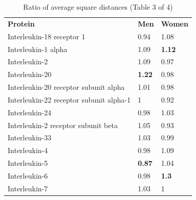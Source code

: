 \begin{table}[ht]
\caption{Ratio of average square distances (Table 3 of 4)}
\centering
\renewcommand{\arraystretch}{1.2}
\begin{tabular}{lll}
\rowcolor[HTML]{FFFFC7} 
\textbf{Protein}                        & \textbf{Men}                         & \textbf{Women}                       \\
Interleukin-18 receptor 1               & {\color[HTML]{C0C0C0} 0.94}          & {\color[HTML]{C0C0C0} 1.08}          \\
Interleukin-1 alpha                     & {\color[HTML]{C0C0C0} 1.09}          & {\color[HTML]{009901} \textbf{1.12}} \\
Interleukin-2                           & {\color[HTML]{C0C0C0} 1.09}          & {\color[HTML]{C0C0C0} 0.97}          \\
Interleukin-20                          & {\color[HTML]{009901} \textbf{1.22}} & {\color[HTML]{C0C0C0} 0.98}          \\
\rowcolor[HTML]{EFEFEF} 
Interleukin-20 receptor subunit alpha   & {\color[HTML]{C0C0C0} 1.01}          & {\color[HTML]{C0C0C0} 0.98}          \\
\rowcolor[HTML]{EFEFEF} 
Interleukin-22 receptor subunit alpha-1 & {\color[HTML]{C0C0C0} 1}             & {\color[HTML]{C0C0C0} 0.92}          \\
\rowcolor[HTML]{EFEFEF} 
Interleukin-24                          & {\color[HTML]{C0C0C0} 0.98}          & {\color[HTML]{C0C0C0} 1.03}          \\
\rowcolor[HTML]{EFEFEF} 
Interleukin-2 receptor subunit beta     & {\color[HTML]{C0C0C0} 1.05}          & {\color[HTML]{C0C0C0} 0.93}          \\
Interleukin-33                          & {\color[HTML]{C0C0C0} 1.03}          & {\color[HTML]{C0C0C0} 0.99}          \\
Interleukin-4                           & {\color[HTML]{C0C0C0} 0.98}          & {\color[HTML]{C0C0C0} 1.09}          \\
Interleukin-5                           & {\color[HTML]{CB0000} \textbf{0.87}} & {\color[HTML]{C0C0C0} 1.04}          \\
Interleukin-6                           & {\color[HTML]{C0C0C0} 0.98}          & {\color[HTML]{009901} \textbf{1.3}}  \\
\rowcolor[HTML]{EFEFEF} 
Interleukin-7                           & {\color[HTML]{C0C0C0} 1.03}          & {\color[HTML]{C0C0C0} 1}             \\

\end{tabular}
\end{table}

